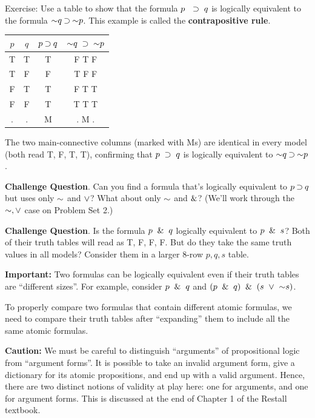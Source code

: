 \documentclass[options]{philosophersimprint}
\theoremstyle{definition}
\begin{document}
Exercise: Use a table to show that the formula $p \ \ \mathbin{\supset} \ q$ is logically equivalent to the formula $\mathord{\sim} q \mathbin{\supset} \mathord{\sim} p$. This example is called the \textbf{contrapositive rule}.

\begin{table}[h!]
    \centering
    \begin{tabular}{c c | c | c}
        $p$ & $q$ & $p\mathbin{\supset} q$ & $\Neg q \ \Cond \ \Neg p$ \\
        \hline
        T & T & T & F \quad T \quad F \qquad\\
        T & F & F & T \quad F \quad F \qquad\\
        F & T & T & F \quad T \quad T \qquad\\
        F & F & T & T \quad T \quad T \qquad\\
        \hline
        $.$ & $.$ & M  & $.$ \quad M \quad $.$ \qquad\\
    \end{tabular}
\end{table}
The two main-connective columns (marked with Ms) are identical in every model (both read T, F, T, T), confirming that $p \ \mathbin{\supset} \ q$ is logically equivalent to $\mathord{\sim} q \mathbin{\supset} \mathord{\sim} p$.

\textbf{Challenge Question}. Can you find a formula that's logically equivalent to $p\mathbin{\supset} q$ but uses only $\mathord{\sim}$ and $\mathbin{\vee}$? What about only $\mathord{\sim}$ and $\mathbin{\&}$? (We'll work through the $\mathord{\sim},\mathbin{\vee}$ case on Problem Set 2.)

\textbf{Challenge Question}. Is the formula $p\ \mathbin{\&} \  q$ logically equivalent to $p\ \mathbin{\&} \  s$? Both of their truth tables will read as T, F, F, F. But do they take the same truth values in all models? Consider them in a larger 8-row $p,q,s$ table.

\textbf{Important:} Two formulas can be logically equivalent even if their truth tables are ``different sizes''. For example, consider $p \ \mathbin{\&} \  q$ and $(p \ \mathbin{\&} \  q) \ \mathbin{\&} \   (s \ \mathbin{\vee} \ \mathord{\sim} s)$.

To properly compare two formulas that contain different atomic formulas, we need to compare their truth tables after ``expanding'' them to include all the same atomic formulas.

\textbf{Caution:} We must be careful to distinguish ``arguments'' of propositional logic from ``argument forms''. It is possible to take an invalid argument form, give a dictionary for its atomic propositions, and end up with a valid argument. Hence, there are two distinct notions of validity at play here: one for arguments, and one for argument forms. This is discussed at the end of Chapter 1 of the Restall textbook.
\end{document}
